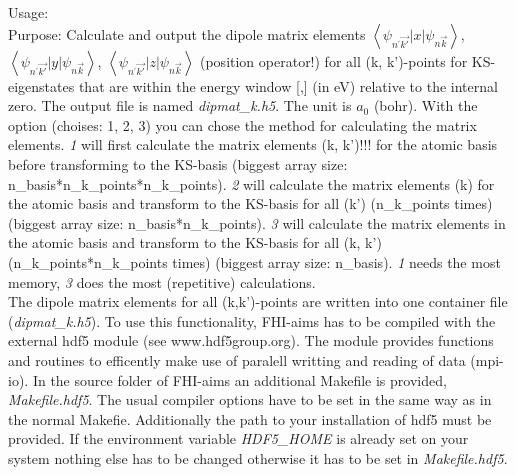 {
  \noindent
  Usage:    \\[1.0ex]
  Purpose: Calculate and output the dipole matrix elements $\left\langle\psi_{n^{'}\vec{k'}}\vert x\vert\psi_{n\vec{k}}\right\rangle$, 
  $\left\langle\psi_{n^{'}\vec{k'}}\vert y\vert\psi_{n\vec{k}}\right\rangle$, $\left\langle\psi_{n^{'}\vec{k'}}\vert z\vert\psi_{n\vec{k}}\right\rangle$
  (position operator!) for all (k, k')-points for KS-eigenstates that are within the energy window [,] (in eV) relative to the 
  internal zero. The output file is named \textit{dipmat\_k}\textit{.h5}. The unit is $a_0$ (bohr). With the option  (choises: 1, 2, 3) 
  you can chose the method for calculating the matrix elements. \textit{1} will first calculate the matrix elements (k, k')!!! for the atomic basis before 
  transforming to the KS-basis (biggest array size: n\_basis*n\_k\_points*n\_k\_points). \textit{2} will calculate the matrix elements (k) for the atomic basis and transform to 
  the KS-basis for all (k') (n\_k\_points times) (biggest array size: n\_basis*n\_k\_points). \textit{3} will calculate the matrix elements in the atomic basis and transform to 
  the KS-basis for all (k, k') (n\_k\_points*n\_k\_points times) (biggest array size: n\_basis). \textit{1} needs the most memory, \textit{3} does the most (repetitive) 
  calculations.\\
  The dipole matrix elements for all (k,k')-points are written into one container file (\textit{dipmat\_k}\textit{.h5}). To use this functionality, FHI-aims 
  has to be compiled with the external hdf5 module (see www.hdf5group.org). The module provides functions and routines to efficently make use of paralell 
  writting and reading of data (mpi-io). In the source folder of FHI-aims an additional Makefile is provided, \textit{Makefile.hdf5}. The usual compiler options have to 
  be set in the same way as in the normal Makefie. Additionally the path to your installation of hdf5 must be provided. If the environment variable \textit{HDF5\_HOME} is 
  already set on your system nothing else has to be changed otherwise it has to be set in \textit{Makefile.hdf5}.\\[1.0ex]
}

